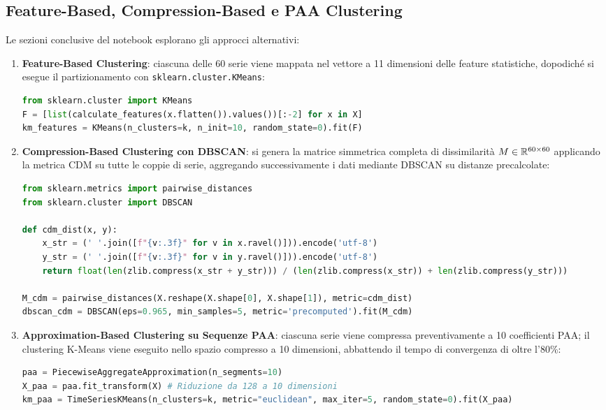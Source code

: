 \FloatBarrier
\subsection{Feature-Based, Compression-Based e PAA Clustering}
\label{subsec:ts-lab-alternative-clusterings}

Le sezioni conclusive del notebook esplorano gli approcci alternativi:

\begin{enumerate}
    \item \textbf{Feature-Based Clustering}: ciascuna delle 60 serie viene mappata nel vettore a 11 dimensioni delle feature statistiche, dopodich\'e si esegue il partizionamento con \texttt{sklearn.cluster.KMeans}:
\begin{lstlisting}[language=Python, style=code]
from sklearn.cluster import KMeans
F = [list(calculate_features(x.flatten()).values())[:-2] for x in X]
km_features = KMeans(n_clusters=k, n_init=10, random_state=0).fit(F)
\end{lstlisting}

    \item \textbf{Compression-Based Clustering con DBSCAN}: si genera la matrice simmetrica completa di dissimilarit\`a $M \in \mathbb{R}^{60 \times 60}$ applicando la metrica CDM su tutte le coppie di serie, aggregando successivamente i dati mediante DBSCAN su distanze precalcolate:
\begin{lstlisting}[language=Python, style=code]
from sklearn.metrics import pairwise_distances
from sklearn.cluster import DBSCAN

def cdm_dist(x, y):
    x_str = (' '.join([f"{v:.3f}" for v in x.ravel()])).encode('utf-8')
    y_str = (' '.join([f"{v:.3f}" for v in y.ravel()])).encode('utf-8')
    return float(len(zlib.compress(x_str + y_str))) / (len(zlib.compress(x_str)) + len(zlib.compress(y_str)))

M_cdm = pairwise_distances(X.reshape(X.shape[0], X.shape[1]), metric=cdm_dist)
dbscan_cdm = DBSCAN(eps=0.965, min_samples=5, metric='precomputed').fit(M_cdm)
\end{lstlisting}

    \item \textbf{Approximation-Based Clustering su Sequenze PAA}: ciascuna serie viene compressa preventivamente a 10 coefficienti PAA; il clustering K-Means viene eseguito nello spazio compresso a 10 dimensioni, abbattendo il tempo di convergenza di oltre l'80\%:
\begin{lstlisting}[language=Python, style=code]
paa = PiecewiseAggregateApproximation(n_segments=10)
X_paa = paa.fit_transform(X) # Riduzione da 128 a 10 dimensioni
km_paa = TimeSeriesKMeans(n_clusters=k, metric="euclidean", max_iter=5, random_state=0).fit(X_paa)
\end{lstlisting}
\end{enumerate}

